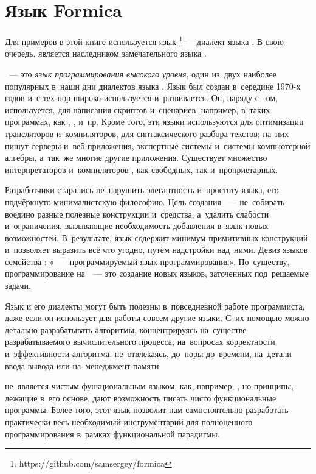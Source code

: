 \section[2]{Язык Formica}%
Для примеров в этой книге используется язык \FLP{}\footnote{https://github.com/samsergey/formica} --- диалект языка \Scheme. В свою очередь, \Scheme является наследником замечательного языка .

~--- это \emph{язык программирования высокого уровня}, один из~двух наиболее популярных в~наши дни диалектов языка \Lisp. Язык  был создан в~середине 1970-х годов и~с тех пор широко используется и~развивается. Он, наряду с~\Lisp-ом, используется, для написания скриптов и~сценариев, например, в~таких программах, как , ,  и~пр. Кроме того, эти языки используются для оптимизации трансляторов и~компиляторов, для синтаксического разбора текстов; на~них пишут серверы и~веб-приложения, экспертные системы и~системы компьютерной алгебры, а~так~же многие другие приложения. Существует множество интерпретаторов и~компиляторов , как свободных, так и~проприетарных.

Разработчики  старались не~нарушить элегантность и~простоту языка, его подчёркнуто минималистскую философию. Цель создания ~--- не~собирать воедино разные полезные конструкции и~средства, а~удалить слабости и~ограничения, вызывающие необходимость добавления в~язык новых возможностей. В~результате, язык содержит минимум примитивных конструкций и~позволяет выразить всё что угодно, путём надстройки над~ними. Девиз языков семейства \Lisp: «\Lisp~--- программируемый язык программирования». По~существу, программирование на~~--- это создание новых языков, заточенных под~решаемые задачи.

Язык  и его диалекты могут быть полезны в~повседневной работе программиста, даже если он использует для работы совсем другие языки. С~их помощью можно детально разрабатывать алгоритмы, концентрируясь на~существе разрабатываемого вычислительного процесса, на~вопросах корректности и~эффективности алгоритма, не~отвлекаясь, до~поры до~времени, на~детали ввода-вывода или на~менеджмент памяти.

 не~является чистым функциональным языком, как, например, , но принципы, лежащие в~его основе, дают возможность писать чисто функциональные программы. Более того, этот язык позволит нам самостоятельно разработать практически весь необходимый инструментарий для полноценного программирования в~рамках функциональной парадигмы.

